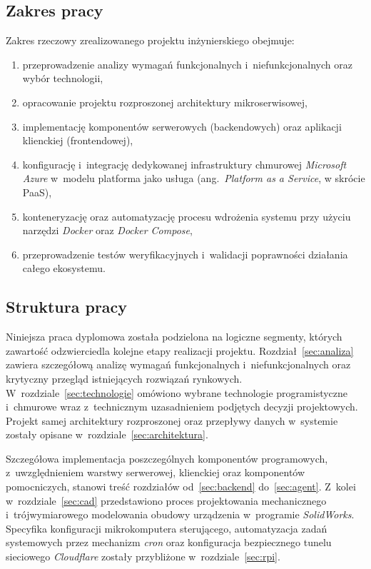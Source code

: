 \documentclass[a4paper,12pt,reqno]{article}
\begin{document}
\subsection{Zakres pracy}
\begin{samepage}
	Zakres rzeczowy zrealizowanego projektu inżynierskiego obejmuje:
	\begin{enumerate}
		\item przeprowadzenie analizy wymagań funkcjonalnych i~niefunkcjonalnych oraz wybór technologii,
		\item opracowanie projektu rozproszonej architektury mikroserwisowej,
		\item implementację komponentów serwerowych (backendowych) oraz aplikacji klienckiej (frontendowej),
		\item konfigurację i~integrację dedykowanej infrastruktury chmurowej \textit{Microsoft Azure} w~modelu platforma jako usługa (ang.~\textit{Platform as a Service}, w skrócie PaaS),
		\item konteneryzację oraz automatyzację procesu wdrożenia systemu przy użyciu narzędzi \textit{Docker} oraz \textit{Docker Compose},
		\item przeprowadzenie testów weryfikacyjnych i~walidacji poprawności działania całego ekosystemu.
	\end{enumerate}
\end{samepage}
\subsection{Struktura pracy}

Niniejsza praca dyplomowa została podzielona na logiczne segmenty, których zawartość odzwierciedla kolejne etapy realizacji projektu. Rozdział~\ref{sec:analiza} zawiera szczegółową analizę wymagań funkcjonalnych i~niefunkcjonalnych oraz krytyczny przegląd istniejących rozwiązań rynkowych. W~rozdziale~\ref{sec:technologie} omówiono wybrane technologie programistyczne i~chmurowe wraz z~technicznym uzasadnieniem podjętych decyzji projektowych. Projekt samej architektury rozproszonej oraz przepływy danych w~systemie zostały opisane w~rozdziale~\ref{sec:architektura}. 

Szczegółowa implementacja poszczególnych komponentów programowych, z~uwzględnieniem warstwy serwerowej, klienckiej oraz komponentów pomocniczych, stanowi treść rozdziałów od~\ref{sec:backend} do~\ref{sec:agent}. Z~kolei w~rozdziale~\ref{sec:cad} przedstawiono proces projektowania mechanicznego i~trójwymiarowego modelowania obudowy urządzenia w~programie \textit{SolidWorks}. Specyfika konfiguracji mikrokomputera sterującego, automatyzacja zadań systemowych przez mechanizm \textit{cron} oraz konfiguracja bezpiecznego tunelu sieciowego \textit{Cloudflare} zostały przybliżone w~rozdziale~\ref{sec:rpi}. 
\end{document}
